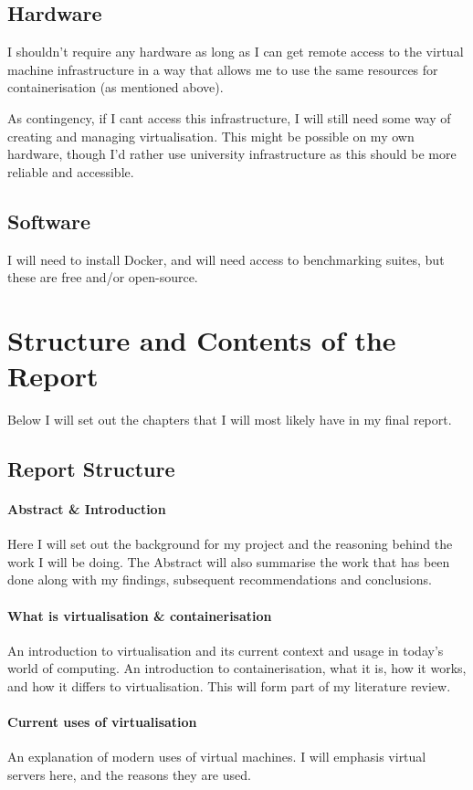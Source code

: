 \subsection{Hardware}
I shouldn't require any hardware as long as I can get remote access to the virtual machine infrastructure in a way that allows me to use the same resources for containerisation (as mentioned above).

As contingency, if I cant access this infrastructure, I will still need some way of creating and managing virtualisation. This might be possible on my own hardware, though I'd rather use university infrastructure as this should be more reliable and accessible.

\subsection{Software}
I will need to install Docker, and will need access to benchmarking suites, but these are free and/or open-source.

\section{Structure and Contents of the Report}
Below I will set out the chapters that I will most likely have in my final report.
\subsection{Report Structure}

\paragraph{Abstract \& Introduction}  Here I will set out the background for my project and the reasoning behind the work I will be doing. The Abstract will also summarise the work that has been done along with my findings, subsequent recommendations and conclusions.

\paragraph{What is virtualisation \& containerisation} An introduction to virtualisation and its current context and usage in today's world of computing. An introduction to containerisation, what it is, how it works, and how it differs to virtualisation. This will form part of my literature review.

\paragraph{Current uses of virtualisation} An explanation of modern uses of virtual machines. I will emphasis virtual servers here, and the reasons they are used.

